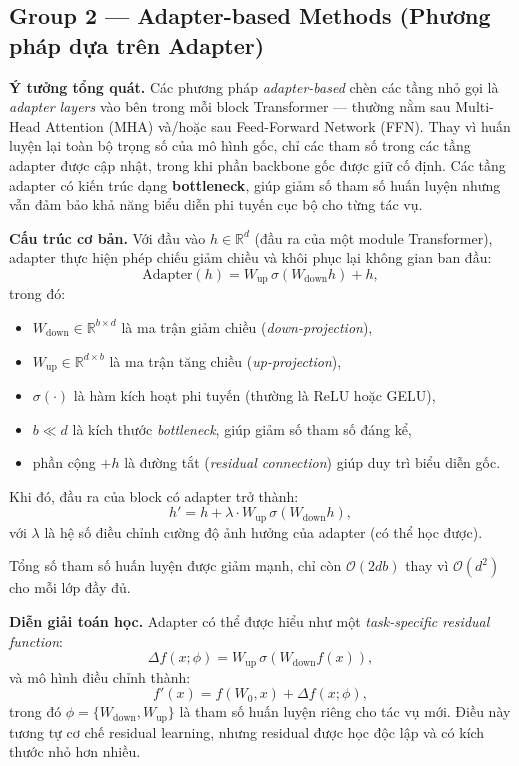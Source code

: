 \subsection{Group 2 — Adapter-based Methods (Phương pháp dựa trên Adapter)}
\label{ssec:adapters}

\textbf{Ý tưởng tổng quát.}  
Các phương pháp \textit{adapter-based} chèn các tầng nhỏ gọi là \emph{adapter layers} vào bên trong mỗi block Transformer — thường nằm sau Multi-Head Attention (MHA) và/hoặc sau Feed-Forward Network (FFN).  
Thay vì huấn luyện lại toàn bộ trọng số của mô hình gốc, chỉ các tham số trong các tầng adapter được cập nhật, trong khi phần backbone gốc được giữ cố định.  
Các tầng adapter có kiến trúc dạng \textbf{bottleneck}, giúp giảm số tham số huấn luyện nhưng vẫn đảm bảo khả năng biểu diễn phi tuyến cục bộ cho từng tác vụ.

\textbf{Cấu trúc cơ bản.}  
Với đầu vào $h \in \mathbb{R}^d$ (đầu ra của một module Transformer), adapter thực hiện phép chiếu giảm chiều và khôi phục lại không gian ban đầu:
\[
\text{Adapter}(h) = W_{\text{up}} \, \sigma(W_{\text{down}} h) + h,
\]
trong đó:
\begin{itemize}
	\item $W_{\text{down}} \in \mathbb{R}^{b \times d}$ là ma trận giảm chiều (\textit{down-projection}),
	\item $W_{\text{up}} \in \mathbb{R}^{d \times b}$ là ma trận tăng chiều (\textit{up-projection}),
	\item $\sigma(\cdot)$ là hàm kích hoạt phi tuyến (thường là ReLU hoặc GELU),
	\item $b \ll d$ là kích thước \textit{bottleneck}, giúp giảm số tham số đáng kể,
	\item phần cộng $+h$ là đường tắt (\textit{residual connection}) giúp duy trì biểu diễn gốc.
\end{itemize}

Khi đó, đầu ra của block có adapter trở thành:
\[
h' = h + \lambda \cdot W_{\text{up}} \, \sigma(W_{\text{down}} h),
\]
với $\lambda$ là hệ số điều chỉnh cường độ ảnh hưởng của adapter (có thể học được).  

Tổng số tham số huấn luyện được giảm mạnh, chỉ còn $\mathcal{O}(2db)$ thay vì $\mathcal{O}(d^2)$ cho mỗi lớp đầy đủ.

\textbf{Diễn giải toán học.}  
Adapter có thể được hiểu như một \textit{task-specific residual function}:
\[
\Delta f(x; \phi) = W_{\text{up}} \, \sigma(W_{\text{down}} f(x)),
\]
và mô hình điều chỉnh thành:
\[
f'(x) = f(W_0, x) + \Delta f(x; \phi),
\]
trong đó $\phi = \{W_{\text{down}}, W_{\text{up}}\}$ là tham số huấn luyện riêng cho tác vụ mới.  
Điều này tương tự cơ chế residual learning, nhưng residual được học độc lập và có kích thước nhỏ hơn nhiều.  

